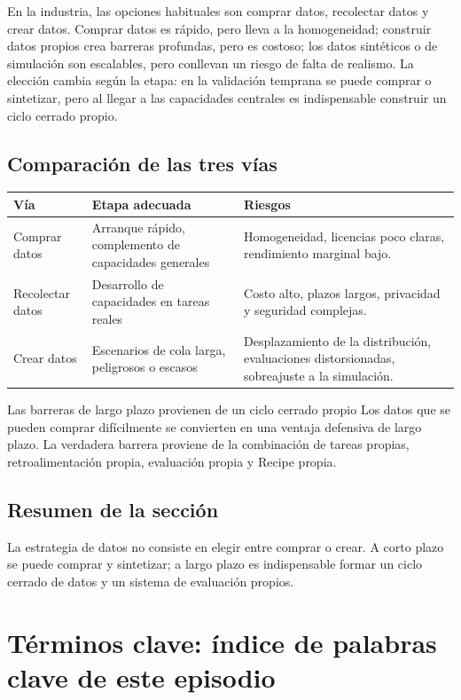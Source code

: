 \documentclass[a4paper]{article}
\begin{document}
En la industria, las opciones habituales son comprar datos, recolectar datos y crear datos. Comprar datos es rápido, pero lleva a la homogeneidad; construir datos propios crea barreras profundas, pero es costoso; los datos sintéticos o de simulación son escalables, pero conllevan un riesgo de falta de realismo. La elección cambia según la etapa: en la validación temprana se puede comprar o sintetizar, pero al llegar a las capacidades centrales es indispensable construir un ciclo cerrado propio.

\subsection{Comparación de las tres vías}

\noindent\begin{tabularx}{\textwidth}{p{}p{}X}
\toprule
Vía & Etapa adecuada & Riesgos \\
\midrule
Comprar datos & Arranque rápido, complemento de capacidades generales & Homogeneidad, licencias poco claras, rendimiento marginal bajo. \\
Recolectar datos & Desarrollo de capacidades en tareas reales & Costo alto, plazos largos, privacidad y seguridad complejas. \\
Crear datos & Escenarios de cola larga, peligrosos o escasos & Desplazamiento de la distribución, evaluaciones distorsionadas, sobreajuste a la simulación. \\
\bottomrule
\end{tabularx}

\begin{importantbox}{Las barreras de largo plazo provienen de un ciclo cerrado propio}
Los datos que se pueden comprar difícilmente se convierten en una ventaja defensiva de largo plazo. La verdadera barrera proviene de la combinación de tareas propias, retroalimentación propia, evaluación propia y Recipe propia.
\end{importantbox}

\subsection{Resumen de la sección}

La estrategia de datos no consiste en elegir entre comprar o crear. A corto plazo se puede comprar y sintetizar; a largo plazo es indispensable formar un ciclo cerrado de datos y un sistema de evaluación propios.
\section{Términos clave: índice de palabras clave de este episodio}
\end{document}
